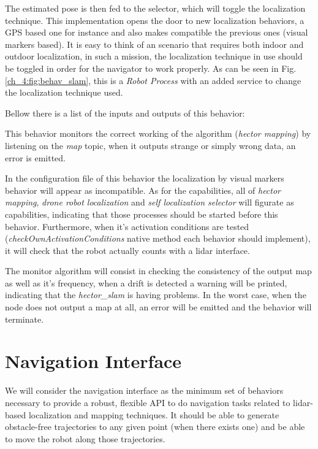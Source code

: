   The estimated pose is then fed to the selector, which will toggle the localization technique. This implementation opens the door to new localization behaviors, a GPS based one for instance and also makes compatible the previous ones (visual markers based). It is easy to think of an scenario that requires both indoor and outdoor localization, in such a mission, the localization technique in use should be toggled in order for the navigator to work properly. As can be seen in Fig. \ref{ch_4:fig:behav_slam}, this is a \textit{Robot Process} with an added service to change the localization technique used.

  Bellow there is a list of the inputs and outputs of this behavior:

  

  This behavior monitors the correct working of the algorithm (\textit{hector mapping}) by listening on the \textit{map} topic, when it outputs strange or simply wrong data, an error is emitted.

  In the configuration file of this behavior the localization by visual markers behavior will appear as incompatible. As for the capabilities, all of \textit{hector mapping}, \textit{drone robot localization} and \textit{self localization selector} will figurate as capabilities, indicating that those processes should be started before this behavior. Furthermore, when it's activation conditions are tested (\textit{checkOwnActivationConditions} native method each behavior should implement), it will check that the robot actually counts with a lidar interface.

  The monitor algorithm will consist in checking the consistency of the output map as well as it's frequency, when a drift is detected a warning will be printed, indicating that the \textit{hector\_slam} is having problems. In the worst case, when the node does not output a map at all, an error will be emitted and the behavior will terminate.

\clearpage

\section{Navigation Interface} \label{ch_4:sect:nav_interface}

  We will consider the navigation interface as the minimum set of behaviors necessary to provide a robust, flexible API to do navigation tasks related to lidar-based localization and mapping techniques. It should be able to generate obstacle-free trajectories  to any given point (when there exists one) and be able to move the robot along those trajectories.


